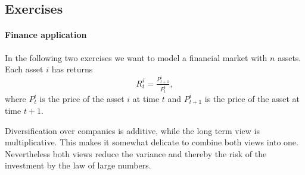 \subsection*{Exercises \thesection}








\paragraph*{Finance application}

In the following two exercises we want to model a financial market with \(n\)
assets. Each asset \(i\) has returns
\begin{equation}
    \label{eq: return definition}    
    R_t^i = \tfrac{P_{t+1}^i}{P_t^i},
\end{equation}
where \(P_t^i\) is the price of the asset \(i\) at time \(t\) and
\(P_{t+1}^i\) is the price of the asset at time \(t+1\).




\begin{remark}
    Diversification over companies is additive, while the long term view
    is multiplicative. This makes it somewhat delicate to combine both views
    into one. Nevertheless both views reduce the variance and thereby the risk
    of the investment by the law of large numbers.
\end{remark}


